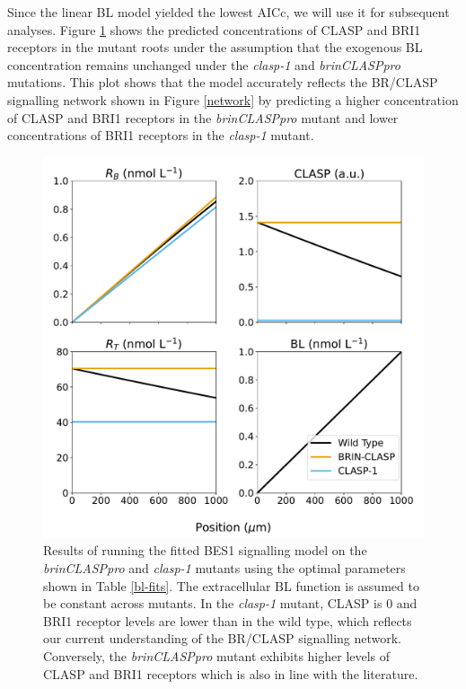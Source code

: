 \documentclass[referee,pdflatex,sn-mathphys-num]{sn-jnl}
\begin{document}
Since the linear BL model yielded the lowest AICc, we will use it for subsequent analyses. Figure \ref{bes1-mutants} shows the predicted concentrations of CLASP and BRI1 receptors in the mutant roots under the assumption that the exogenous BL concentration remains unchanged under the \emph{clasp-1} and \emph{brinCLASPpro} mutations. This plot shows that the model accurately reflects the BR/CLASP signalling network shown in Figure \ref{network} by predicting a higher concentration of CLASP and BRI1 receptors in the \emph{brinCLASPpro} mutant and lower concentrations of BRI1 receptors in the \emph{clasp-1} mutant.

\begin{figure}
  \centering
  \includegraphics[width=\textwidth]{bes1-mutants.pdf}
  \caption{Results of running the fitted BES1 signalling model on the \emph{brinCLASPpro} and \emph{clasp-1} mutants using the optimal parameters shown in Table \ref{bl-fits}. The extracellular BL function is assumed to be constant across mutants. In the \emph{clasp-1} mutant, CLASP is $0$ and BRI1 receptor levels are lower than in the wild type, which reflects our current understanding of the BR/CLASP signalling network. Conversely, the \emph{brinCLASPpro} mutant exhibits higher levels of CLASP and BRI1 receptors which is also in line with the literature.}
\label{bes1-mutants}
\end{figure}
\end{document}
